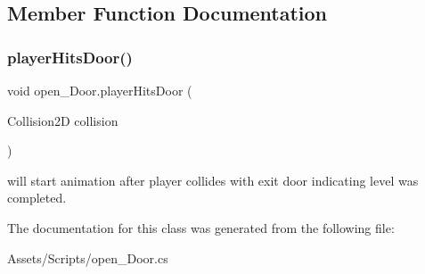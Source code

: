 \subsection{Member Function Documentation}
\mbox{\label{classopen___door_af445b9df0f862ee2c2d667d6b1f92811}} 
\subsubsection{\texorpdfstring{player\+Hits\+Door()}{playerHitsDoor()}}
{\footnotesize\ttfamily void open\+\_\+\+Door.\+player\+Hits\+Door (\begin{DoxyParamCaption}\item[{Collision2D}]{collision }\end{DoxyParamCaption})\hspace{0.3cm}{\ttfamily [inline]}}

will start animation after player collides with exit door indicating level was completed. 

The documentation for this class was generated from the following file\+:\begin{DoxyCompactItemize}
\item 
Assets/\+Scripts/open\+\_\+\+Door.\+cs\end{DoxyCompactItemize}
